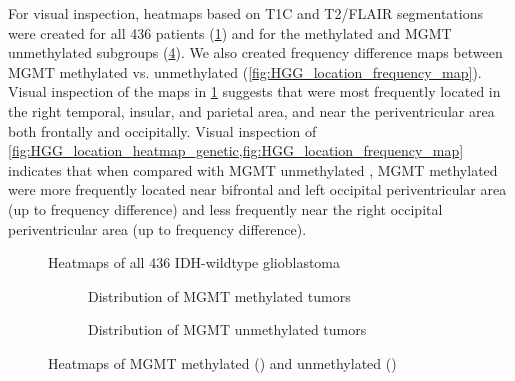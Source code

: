 For visual inspection, heatmaps based on \gls{T1C} and \gls{T2}/\gls{FLAIR} segmentations were created for all 436 patients (\cref{fig:HGG_location_heatmap}) and for the  methylated and \gls{MGMT} unmethylated subgroups (\cref{fig:HGG_location_heatmap_genetic}).
We also created frequency difference maps between \gls{MGMT} methylated vs. unmethylated  (\cref{fig:HGG_location_frequency_map}).
Visual inspection of the maps in \cref{fig:HGG_location_heatmap} suggests that  were most frequently located in the right temporal, insular, and parietal area, and near the periventricular area both frontally and occipitally.
Visual inspection of \cref{fig:HGG_location_heatmap_genetic,fig:HGG_location_frequency_map} indicates that when compared with \gls{MGMT} unmethylated , \gls{MGMT} methylated  were more frequently located near bifrontal and left occipital periventricular area (up to  frequency difference) and less frequently near the right occipital periventricular area (up to  frequency difference).


\begin{figure}[htbp]
\centering

\caption{Heatmaps of all 436 \acrshort{IDH}-wildtype glioblastoma}\label{fig:HGG_location_heatmap}
\end{figure}

\begin{figure}[htbp]
    \centering
    \begin{subfigure}[b]{\textwidth}
        \centering
        \caption{Distribution of \gls{MGMT} methylated \glspl{tumor}}\label{fig:HGG_location_heatmap_methylated}
    \end{subfigure}
    \begin{subfigure}[b]{\textwidth}
        \centering
        \caption{Distribution of \gls{MGMT} unmethylated \glspl{tumor}}\label{fig:HGG_location_heatmap_unmethylated}
    \end{subfigure}
    \caption{Heatmaps of \acrshort{MGMT} methylated () and unmethylated () }\label{fig:HGG_location_heatmap_genetic}
\end{figure}


